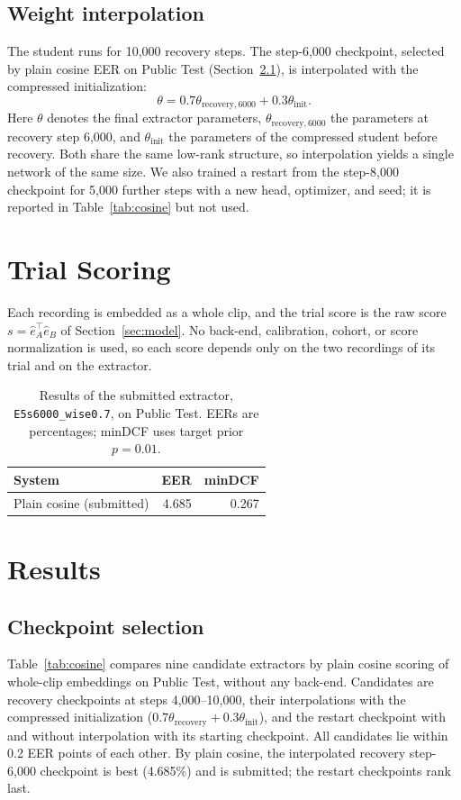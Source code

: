 \documentclass[11pt]{article}
\begin{document}
\subsection{Weight interpolation}
The student runs for 10,000 recovery steps. The step-6,000 checkpoint, selected by plain cosine EER on Public Test (Section~\ref{sec:selection}), is interpolated with the compressed initialization:
\begin{equation}
 \theta=0.7\theta_{\mathrm{recovery},6000}
       +0.3\theta_{\mathrm{init}}.
\end{equation}
Here $\theta$ denotes the final extractor parameters, $\theta_{\mathrm{recovery},6000}$ the parameters at recovery step 6,000, and $\theta_{\mathrm{init}}$ the parameters of the compressed student before recovery. Both share the same low-rank structure, so interpolation yields a single network of the same size. We also trained a restart from the step-8,000 checkpoint for 5,000 further steps with a new head, optimizer, and seed; it is reported in Table~\ref{tab:cosine} but not used.

\section{Trial Scoring}
\label{sec:scoring}
Each recording is embedded as a whole clip, and the trial score is the raw score $s=\hat e_A^\top\hat e_B$ of Section~\ref{sec:model}. No back-end, calibration, cohort, or score normalization is used, so each score depends only on the two recordings of its trial and on the extractor.

\begin{table}[t]
\centering
\small
\setlength{\tabcolsep}{3.5pt}
\begin{tabular}{@{}lrr@{}}
\toprule
System & EER & minDCF \\
\midrule
Plain cosine (submitted) & 4.685 & 0.267 \\
\bottomrule
\end{tabular}
\caption{Results of the submitted extractor, \nolinkurl{E5s6000_wise0.7}, on Public Test. EERs are percentages; minDCF uses target prior $p=0.01$.}
\label{tab:final}
\end{table}

\section{Results}
\subsection{Checkpoint selection}
\label{sec:selection}
Table~\ref{tab:cosine} compares nine candidate extractors by plain cosine scoring of whole-clip embeddings on Public Test, without any back-end. Candidates are recovery checkpoints at steps 4,000--10,000, their interpolations with the compressed initialization ($0.7\theta_{\mathrm{recovery}}+0.3\theta_{\mathrm{init}}$), and the restart checkpoint with and without interpolation with its starting checkpoint. All candidates lie within 0.2 EER points of each other. By plain cosine, the interpolated recovery step-6,000 checkpoint is best (4.685\%) and is submitted; the restart checkpoints rank last.
\end{document}
